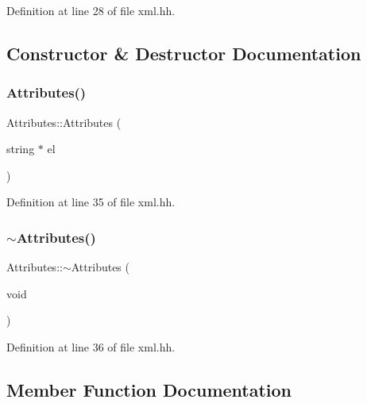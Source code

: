 Definition at line 28 of file xml.\+hh.



\subsection{Constructor \& Destructor Documentation}
\mbox{\label{class_attributes_abdd2066e49bfdf6f9c6c6ce8cb9d248a}} 
\subsubsection{\texorpdfstring{Attributes()}{Attributes()}}
{\footnotesize\ttfamily Attributes\+::\+Attributes (\begin{DoxyParamCaption}\item[{string $\ast$}]{el }\end{DoxyParamCaption})\hspace{0.3cm}{\ttfamily [inline]}}



Definition at line 35 of file xml.\+hh.

\mbox{\label{class_attributes_ad397fc8278fd4d11ff52d02a4d482a68}} 
\subsubsection{\texorpdfstring{$\sim$Attributes()}{~Attributes()}}
{\footnotesize\ttfamily Attributes\+::$\sim$\+Attributes (\begin{DoxyParamCaption}\item[{void}]{ }\end{DoxyParamCaption})\hspace{0.3cm}{\ttfamily [inline]}}



Definition at line 36 of file xml.\+hh.



\subsection{Member Function Documentation}
\mbox{\label{class_attributes_afb97d6c90709f45f2eba30df107a1a86}} 
